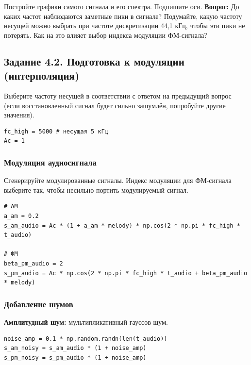 \documentclass[12pt,a4paper,openany]{book}
\begin{document}
Постройте графики самого сигнала и его спектра. Подпишите оси.
\textbf{Вопрос:} До каких частот наблюдаются заметные пики в сигнале? Подумайте, какую частоту несущей можно выбрать при частоте дискретизации 44,1 кГц, чтобы эти пики не потерять. Как на это влияет выбор индекса модуляции ФМ-сигнала?

\subsection*{Задание 4.2. Подготовка к модуляции (интерполяция)}

Выберите частоту несущей в соответствии с ответом на предыдущий вопрос (если восстановленный сигнал будет сильно зашумлён, попробуйте другие значения).

\begin{Verbatim}[fontsize=\small, breaklines, breakanywhere, frame=single, framesep=2mm]
fc_high = 5000 # несущая 5 кГц
Ac = 1
\end{Verbatim}

\subsubsection*{Модуляция аудиосигнала}

Сгенерируйте модулированные сигналы. Индекс модуляции для ФМ-сигнала выберите так, чтобы несильно портить модулируемый сигнал.

\begin{Verbatim}[fontsize=\small, breaklines, breakanywhere, frame=single, framesep=2mm]
# АМ
a_am = 0.2
s_am_audio = Ac * (1 + a_am * melody) * np.cos(2 * np.pi * fc_high * t_audio)

# ФМ
beta_pm_audio = 2
s_pm_audio = Ac * np.cos(2 * np.pi * fc_high * t_audio + beta_pm_audio * melody)
\end{Verbatim}

\subsubsection*{Добавление шумов}

\textbf{Амплитудный шум:} мультипликативный гауссов шум.

\begin{Verbatim}[fontsize=\small, breaklines, breakanywhere, frame=single, framesep=2mm]
noise_amp = 0.1 * np.random.randn(len(t_audio))
s_am_noisy = s_am_audio * (1 + noise_amp)
s_pm_noisy = s_pm_audio * (1 + noise_amp)
\end{Verbatim}
\end{document}
